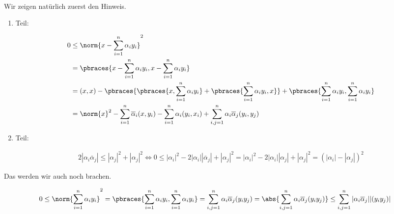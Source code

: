 \begin{solution}

Wir zeigen natürlich zuerst den Hinweis.

\begin{enumerate}[label = \arabic*.]

    \item Teil:
    
    \begin{align*}
        0
        & \leq
        \norm
        {
            x - \sum_{i=1}^n \alpha_i y_i
        }^2 \\
        & =
        \pbraces
        {
            x - \sum_{i=1}^n \alpha_i y_i,
            x - \sum_{i=1}^n \alpha_i y_i
        } \\
        & =
        (x, x)
        -
        \pbraces
        {
            \pbraces
            {
                x,
                \sum_{i=1}^n \alpha_i y_i
            }
            +
            \pbraces
            {
                \sum_{i=1}^n \alpha_i y_i,
                x
            }
        }
        +
        \pbraces
        {
            \sum_{i=1}^n \alpha_i y_i,
            \sum_{i=1}^n \alpha_i y_i
        } \\
        & =
        \norm{x}^2
        -
        \sum_{i=1}^n \overline \alpha_i (x, y_i)
        -
        \sum_{i=1}^n \alpha_i (y_i, x_i)
        +
        \sum_{i,j=1}^n \alpha_i \overline \alpha_j (y_i, y_j)
    \end{align*}

    \item Teil:
    
    \begin{align*}
        2 |\alpha_i \overline \alpha_j|
        \leq
        |\alpha_j|^2 + |\alpha_j|^2
        \iff
        0
        \leq
        |\alpha_i|^2 - 2 |\alpha_i| |\overline \alpha_j| + |\alpha_j|^2
        =
        |\alpha_i|^2 - 2 |\alpha_i| |\alpha_j| + |\alpha_j|^2
        =
        (|\alpha_i| - |\alpha_j|)^2
    \end{align*}

\end{enumerate}

Das werden wir auch noch brachen.

\begin{align*}
    0
    \leq
    \norm
    {
        \sum_{i=1}^n \alpha_i y_i
    }^2
    =
    \pbraces
    {
        \sum_{i=1}^n \alpha_i y_i,
        \sum_{i=1}^n \alpha_i y_i
    }
    =
    \sum_{i,j=1}^n \alpha_i \overline \alpha_j (y_i y_j)
    =
    \abs
    {
        \sum_{i,j=1}^n \alpha_i \overline \alpha_j (y_i y_j)
    }
    \leq
    \sum_{i,j=1}^n |\alpha_i \overline \alpha_j| |(y_i y_j)|
\end{align*}


\end{solution}
